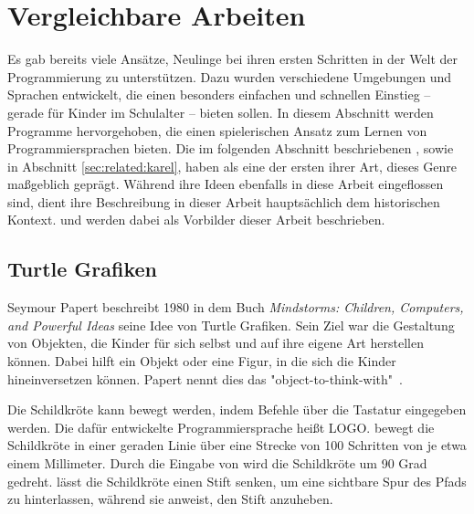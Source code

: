 \chapter{Vergleichbare Arbeiten}
\label{sec:related}

Es gab bereits viele Ansätze, Neulinge bei ihren ersten Schritten in der Welt der Programmierung zu unterstützen. Dazu wurden verschiedene Umgebungen und Sprachen entwickelt, die einen besonders einfachen und schnellen Einstieg -- gerade für Kinder im Schulalter -- bieten sollen. In diesem Abschnitt werden Programme hervorgehoben, die einen spielerischen Ansatz zum Lernen von Programmiersprachen bieten. Die im folgenden Abschnitt beschriebenen , sowie  in Abschnitt \ref{sec:related:karel}, haben als eine der ersten ihrer Art, dieses Genre maßgeblich geprägt. Während ihre Ideen ebenfalls in diese Arbeit eingeflossen sind, dient ihre Beschreibung in dieser Arbeit hauptsächlich dem historischen Kontext.  und  werden dabei als Vorbilder dieser Arbeit beschrieben.

\section{Turtle Grafiken}
\label{sec:related:turtle}

Seymour Papert beschreibt 1980 in dem Buch \textit{Mindstorms: Children, Computers, and Powerful Ideas} seine Idee von Turtle Grafiken. Sein Ziel war die Gestaltung von Objekten, die Kinder für sich selbst und auf ihre eigene Art herstellen können. Dabei hilft ein Objekt oder eine Figur, in die sich die Kinder hineinversetzen können. Papert nennt dies das "object-to-think-with"~\cite[11]{papert1980}.

Die Schildkröte kann bewegt werden, indem Befehle über die Tastatur eingegeben werden. Die dafür entwickelte Programmiersprache heißt LOGO.  bewegt die Schildkröte in einer geraden Linie über eine Strecke von 100 Schritten von je etwa einem Millimeter. Durch die Eingabe von  wird die Schildkröte um 90 Grad gedreht.  lässt die Schildkröte einen Stift senken, um eine sichtbare Spur des Pfads zu hinterlassen, während  sie anweist, den Stift anzuheben.

